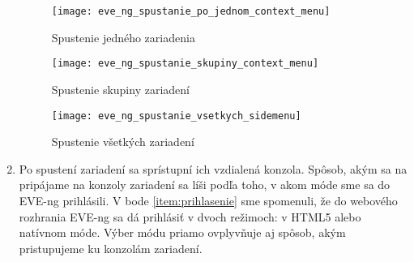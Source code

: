 \begin{enumerate}[noitemsep]
\begin{comment}
\begin{figure}
    \centering
    \texttt{[image: eve\_ng\_spustanie\_po\_jednom\_context\_menu]}
    \caption{Spustenie jedného zariadenia}
    \label{obr:eve_ng_spustanie_po_jednom_context_menu}
\end{figure}

\begin{figure}
    \centering
    \texttt{[image: eve\_ng\_spustanie\_skupiny\_context\_menu]}
    \caption{Spustenie skupiny zariadení}
    \label{obr:eve_ng_spustanie_skupiny_context_menu}
\end{figure}
\end{comment}

\begin{figure}
\begin{minipage}{.4\textwidth}
    \vspace{1.1cm}
    \centering
    \texttt{[image: eve\_ng\_spustanie\_po\_jednom\_context\_menu]}
    \caption{Spustenie jedného zariadenia}
\label{obr:eve_ng_spustanie_po_jednom_context_menu}
\end{minipage}%
\begin{minipage}{.6\textwidth}
    \centering
    \texttt{[image: eve\_ng\_spustanie\_skupiny\_context\_menu]}
    \caption{Spustenie skupiny zariadení}
    \label{obr:eve_ng_spustanie_skupiny_context_menu}
\end{minipage}
\end{figure}

\begin{figure}
    \centering
    \texttt{[image: eve\_ng\_spustanie\_vsetkych\_sidemenu]}
    \caption{Spustenie všetkých zariadení}
    \label{obr:eve_ng_spustanie_vsetkych_context_menu}
\end{figure}
      
    \item \label{item:vzdialeny_pristup} Po spustení zariadení sa sprístupní ich vzdialená konzola. Spôsob, akým sa na pripájame na konzoly zariadení sa líši podľa toho, v akom móde sme sa do EVE-ng prihlásili. V bode \ref{item:prihlasenie} sme spomenuli, že do webového rozhrania EVE-ng sa dá prihlásiť v dvoch režimoch: v HTML5 alebo natívnom móde. Výber módu priamo ovplyvňuje aj spôsob, akým pristupujeme ku konzolám zariadení.
    

\end{enumerate}
